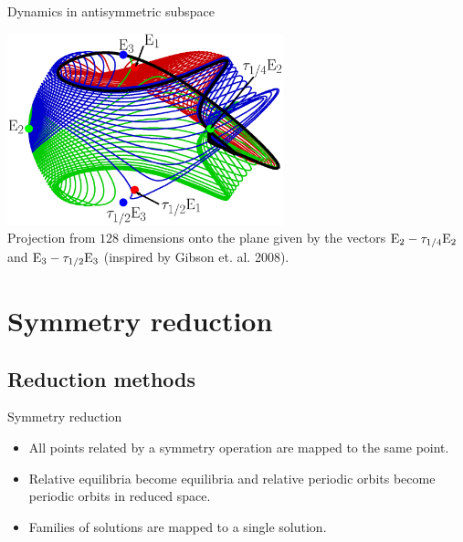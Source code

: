 \documentclass{beamer}
\begin{document}

\begin{frame}{Dynamics in antisymmetric subspace}
 \begin{centering}
         \includegraphics[width=0.6\textwidth,clip=true]{../../figs/KS22hetero} \\
	Projection from $128$ dimensions onto the plane given by the vectors 
	$\mathrm{E}_{2}-\tau_{1/4}\mathrm{E}_{2}$ and $\mathrm{E}_{3}-\tau_{1/2}\mathrm{E}_{3}$ (inspired by Gibson et. al. 2008).
 \end{centering}
\end{frame}

\section{Symmetry reduction}

\subsection{Reduction methods}

\begin{frame}{Symmetry reduction}
\begin{itemize}
 \item All points related by a symmetry operation are mapped to the same point.
 \item Relative equilibria become equilibria and relative periodic orbits become periodic orbits in reduced space.
 \item Families of solutions are mapped to a single solution.
\end{itemize}
\end{frame}
\end{document}
